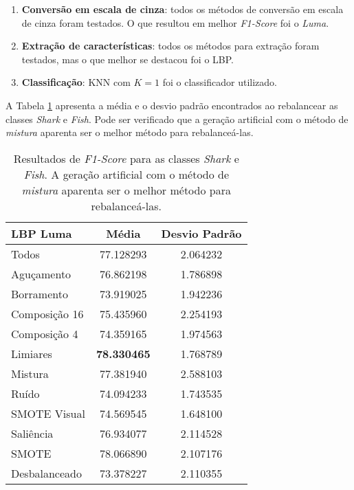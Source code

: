 \begin{enumerate}
\item \textbf{Conversão em escala de cinza}: todos os métodos de conversão em escala de cinza foram testados. O que resultou em melhor \textit{F1-Score} foi o \emph{Luma}.

\item \textbf{Extração de características}: todos os métodos para extração foram testados, mas o que melhor se destacou foi o LBP.
\item \textbf{Classificação}: KNN com $K = 1$ foi o classificador utilizado.

\end{enumerate}

A Tabela \ref{tab:resultados:5.2} apresenta a média e o desvio padrão encontrados ao rebalancear as classes \textit{Shark} e \textit{Fish}. Pode ser verificado que a geração artificial com o método de \emph{mistura} aparenta ser o melhor método para rebalanceá-las.

\begin{table}[H]
\begin{center}
\caption{Resultados de \textit{F1-Score} para as classes \textit{Shark} e \textit{Fish}. A geração artificial com o método de \emph{mistura} aparenta ser o melhor método para rebalanceá-las.}
\label{tab:resultados:5.2}
\begin{tabular}{|l|c|c|}
\hline
\textbf{LBP Luma} & \textbf{Média}     & \textbf{Desvio Padrão} \\ \hline
   Todos        &  77.128293 &  2.064232  \\ \hline
  Aguçamento    &  76.862198 &  1.786898  \\ \hline
  Borramento    &  73.919025 &  1.942236  \\ \hline
  Composição 16 &  75.435960 &  2.254193  \\ \hline
  Composição 4  &  74.359165 &  1.974563  \\ \hline
  Limiares      &  \textbf{78.330465} &  1.768789  \\ \hline
  Mistura       &  77.381940 &  2.588103  \\ \hline
  Ruído         &  74.094233 &  1.743535  \\ \hline
  SMOTE Visual  &  74.569545 &  1.648100  \\ \hline
  Saliência     &  76.934077 &  2.114528  \\ \hline
 SMOTE          &  78.066890 &  2.107176  \\ \hline
Desbalanceado   &  73.378227 &  2.110355  \\ \hline
\end{tabular}
\end{center}
\end{table}

